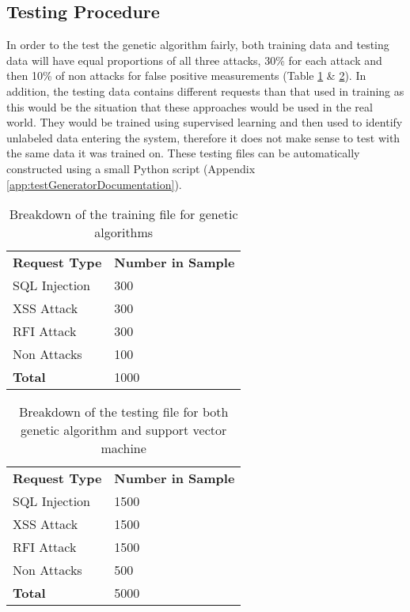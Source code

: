 \subsection{Testing Procedure}

In order to the test the genetic algorithm fairly, both training data and testing data will have equal proportions of all three attacks, 30\% for each attack and then 10\% of non attacks for false positive measurements (Table \ref{tab:trainingfile} \& \ref{tab:testfile}).  In addition, the testing data contains different requests than that used in training as this would be the situation that these approaches would be used in the real world.  They would be trained using supervised learning and then used to identify unlabeled data entering the system, therefore it does not make sense to test with the same data it was trained on.  These testing files can be automatically constructed using a small Python script (Appendix \ref{app:testGeneratorDocumentation}).

\begin{table}
	\centering
	\begin{tabular}{|p{1.5in}|p{2.0in}|}
	\hline
		\textbf{Request Type} & \textbf{Number in Sample}\\
	\hhline{|=|=|}
		SQL Injection & 300 \\
	\hline
		XSS Attack & 300 \\
	\hline
		RFI Attack & 300 \\
	\hline
		Non Attacks & 100 \\
	\hhline{|=|=|}
		\textbf{Total} & 1000 \\
	\hline
	\end{tabular}
	\caption{Breakdown of the training file for genetic algorithms}
	\label{tab:trainingfile}
\end{table}	
	
\begin{table}
	\centering
	\begin{tabular}{|p{1.5in}|p{2.0in}|}
	\hline
		\textbf{Request Type} & \textbf{Number in Sample}\\
	\hhline{|=|=|}
		SQL Injection & 1500 \\
	\hline
		XSS Attack & 1500 \\
	\hline
		RFI Attack & 1500 \\
	\hline
		Non Attacks & 500 \\
	\hhline{|=|=|}
		\textbf{Total} & 5000 \\
	\hline
	\end{tabular}
	\caption{Breakdown of the testing file for both genetic algorithm and support vector machine}
	\label{tab:testfile}
\end{table}	

